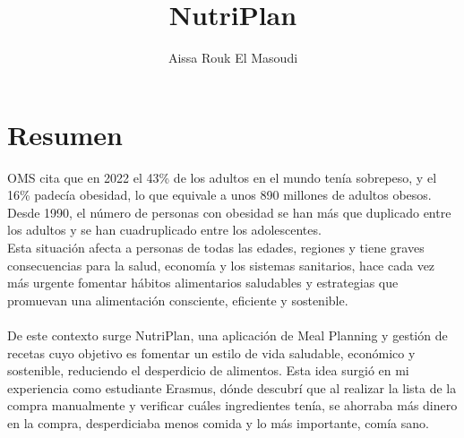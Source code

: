 \documentclass[12pt,a4paper]{report} %
\begin{document}
	
	\title{NutriPlan}
	\author{Aissa Rouk El Masoudi}
	\maketitle
	
	\section*{Resumen}
	OMS cita que en 2022 el 43\% de los adultos en el mundo tenía sobrepeso, y el 16\% padecía obesidad, lo que equivale a unos 890 millones de adultos obesos\cite{OMSObesidadySobrepeso}. Desde 1990, el número de personas con obesidad se han más que duplicado entre los adultos y se han cuadruplicado entre los adolescentes\cite{ONUAAComercioAlimentosyObesidad}.
	\\Esta situación afecta a personas de todas las edades, regiones y tiene graves consecuencias para la salud, economía y los sistemas sanitarios, hace cada vez más urgente fomentar hábitos alimentarios saludables y estrategias que promuevan una alimentación consciente, eficiente y sostenible.
	\\\\De este contexto surge NutriPlan, una aplicación de Meal Planning y gestión de recetas cuyo objetivo es fomentar un estilo de vida saludable, económico y sostenible, reduciendo el desperdicio de alimentos. 
	Esta idea surgió en mi experiencia como estudiante Erasmus, dónde descubrí que al realizar la lista de la compra manualmente y verificar cuáles ingredientes tenía, se ahorraba más dinero en la compra, desperdiciaba menos comida y lo más importante, comía sano.

	
	
\end{document}
